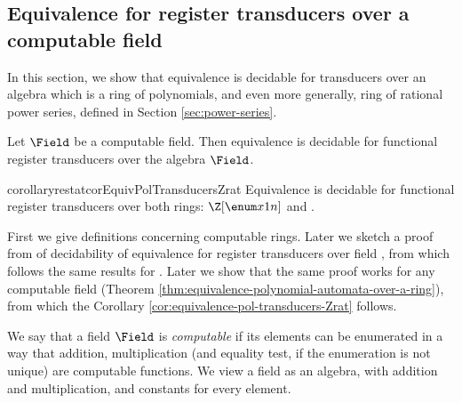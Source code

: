 \subsection{Equivalence for register transducers over a computable field}\label{sec:pol-transducers-any-ring}


In this section, we show that equivalence is decidable for transducers over an algebra which is a ring of polynomials, and even more generally, ring of rational power series, defined in Section \ref{sec:power-series}.
\begin{theorem}\label{thm:equivalence-polynomial-automata-over-a-ring}
	Let $\Field$ be a computable field. Then equivalence is decidable for functional register transducers over the algebra $\Field$.
\end{theorem}
\begin{restatable}{corollaryrestat}{corEquivPolTransducersZrat}\label{cor:equivalence-pol-transducers-Zrat}
		Equivalence is decidable for functional register transducers over both rings: $\Z[\enum x1n]$ and \Zrat.
\end{restatable}
First we give definitions concerning computable rings. Later we sketch a proof from \cite[Theorem 6.6]{seidlManethKemper2018} of decidability of equivalence for register transducers over field \Q, from which follows the same results for \Z. Later we show that the same proof works for any computable field (Theorem \ref{thm:equivalence-polynomial-automata-over-a-ring}), from which the Corollary \ref{cor:equivalence-pol-transducers-Zrat} follows.

We say that a field $\Field$ is \emph{computable} if its elements can be enumerated in a way that addition, multiplication (and equality test, if the enumeration is not unique) are computable functions. %
We view a field as an algebra, with addition and multiplication, and constants for every element.

